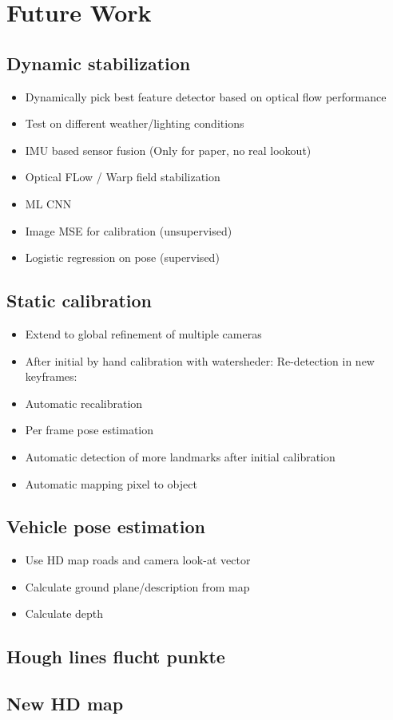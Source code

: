 \section{Future Work}

\subsection{Dynamic stabilization}
\begin{itemize}
  \item Dynamically pick best feature detector based on optical flow performance
  \item Test on different weather/lighting conditions
  \item IMU based sensor fusion (Only for paper, no real lookout)
  \item Optical FLow / Warp field stabilization
  \item ML CNN
    \item Image MSE for calibration (unsupervised)
    \item Logistic regression on pose (supervised)
\end{itemize}
\subsection{Static calibration}
\begin{itemize}
  \item Extend to global refinement of multiple cameras
  \item After initial by hand calibration with watersheder: Re-detection in new keyframes:
    \item Automatic recalibration
    \item Per frame pose estimation
  \item Automatic detection of more landmarks after initial calibration
  \item Automatic mapping pixel to object
\end{itemize}
\subsection{Vehicle pose estimation}
\begin{itemize}
\item Use HD map roads and camera look-at vector
  \item Calculate ground plane/description from map
  \item Calculate depth
\end{itemize}
\subsection{Hough lines flucht punkte}
\subsection{New HD map}